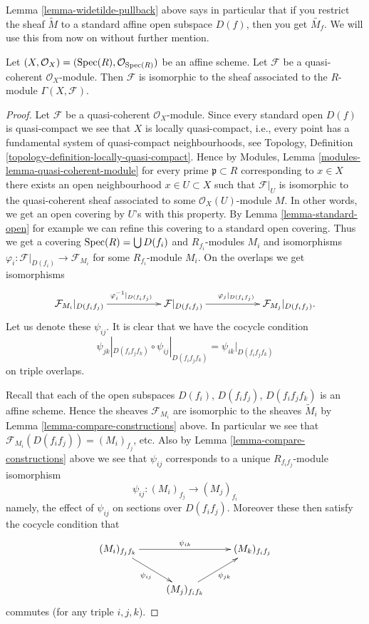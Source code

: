\noindent
Lemma \ref{lemma-widetilde-pullback} above says in particular
that if you restrict
the sheaf $\widetilde M$ to a standard affine open subspace
$D(f)$, then you get $\widetilde{M_f}$. We will use this from
now on without further mention.

\begin{lemma}
\label{lemma-quasi-coherent-affine}
Let $(X, \mathcal{O}_X) = (\mathop{\mathrm{Spec}}(R), \mathcal{O}_{\mathop{\mathrm{Spec}}(R)})$
be an affine scheme. Let $\mathcal{F}$ be a
quasi-coherent $\mathcal{O}_X$-module. Then
$\mathcal{F}$ is isomorphic to the sheaf associated to
the $R$-module $\Gamma(X, \mathcal{F})$.
\end{lemma}

\begin{proof}
Let $\mathcal{F}$ be a quasi-coherent $\mathcal{O}_X$-module.
Since every standard open $D(f)$ is quasi-compact we see that
$X$ is locally quasi-compact, i.e., every point has a fundamental
system of quasi-compact neighbourhoods, see Topology,
Definition \ref{topology-definition-locally-quasi-compact}.
Hence by Modules, Lemma \ref{modules-lemma-quasi-coherent-module}
for every prime $\mathfrak p \subset R$ corresponding to $x \in X$
there exists an open neighbourhood $x \in U \subset X$ such that
$\mathcal{F}|_U$ is isomorphic to the quasi-coherent
sheaf associated to some $\mathcal{O}_X(U)$-module $M$.
In other words, we get an open covering by $U$'s with this property.
By Lemma \ref{lemma-standard-open} for example we can refine this
covering to  a standard open covering.
Thus we get a covering $\mathop{\mathrm{Spec}}(R) = \bigcup D(f_i)$
and $R_{f_i}$-modules $M_i$ and isomorphisms
$\varphi_i : \mathcal{F}|_{D(f_i)} \to \mathcal{F}_{M_i}$
for some $R_{f_i}$-module $M_i$. On the overlaps
we get isomorphisms
$$
\xymatrix{
\mathcal{F}_{M_i}|_{D(f_if_j)}
\ar[rr]^{\varphi_i^{-1}|_{D(f_if_j)}}
& &
\mathcal{F}|_{D(f_if_j)}
\ar[rr]^{\varphi_j|_{D(f_if_j)}}
& &
\mathcal{F}_{M_j}|_{D(f_if_j)}.
}
$$
Let us denote these $\psi_{ij}$. It is clear that
we have the cocycle condition
$$
\psi_{jk}|_{D(f_if_jf_k)}
\circ
\psi_{ij}|_{D(f_if_jf_k)}
=
\psi_{ik}|_{D(f_if_jf_k)}
$$
on triple overlaps.

\medskip\noindent
Recall that each of the open subspaces $D(f_i)$, $D(f_if_j)$,
$D(f_if_jf_k)$ is an affine scheme. Hence the sheaves $\mathcal{F}_{M_i}$
are isomorphic to the sheaves $\widetilde M_i$ by Lemma
\ref{lemma-compare-constructions} above. In particular we see that
$\mathcal{F}_{M_i}(D(f_if_j)) = (M_i)_{f_j}$, etc.
Also by Lemma \ref{lemma-compare-constructions} above we see
that $\psi_{ij}$ corresponds to a unique $R_{f_if_j}$-module isomorphism
$$
\psi_{ij} : (M_i)_{f_j} \longrightarrow (M_j)_{f_i}
$$
namely, the effect of $\psi_{ij}$ on sections over $D(f_if_j)$.
Moreover these then satisfy the cocycle condition that
$$
\xymatrix{
(M_i)_{f_jf_k}
\ar[rd]_{\psi_{ij}}
\ar[rr]^{\psi_{ik}}
& &
(M_k)_{f_if_j} \\
&
(M_j)_{f_if_k} \ar[ru]_{\psi_{jk}}
}
$$
commutes (for any triple $i, j, k$).


\end{proof}
